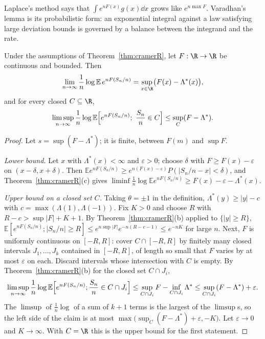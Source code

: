 Laplace's method says that $\int e^{nF(x)}g(x)\dd x$ grows like $e^{n\max F}$. Varadhan's lemma is its probabilistic form: an exponential integral against a law satisfying
large deviation bounds is governed by a balance between the integrand and the rate.

\begin{theorem}\label{thm:varadhan}
Under the assumptions of Theorem~\ref{thm:cramerR}, let $F:\R\to\R$ be continuous and bounded. Then
\[
\lim_{n\to\infty}\frac1n\log\mathbb E\,e^{nF(S_n/n)}=\sup_{x\in\R}\bigl(F(x)-\Lambda^*(x)\bigr),
\]
and for every closed $C\subseteq\R$,
\[
\limsup_{n\to\infty}\frac1n\log\mathbb E\Bigl[e^{nF(S_n/n)};\ \frac{S_n}n\in C\Bigr]\le\sup_C(F-\Lambda^*).
\]
\end{theorem}
\begin{proof}
Let $s=\sup(F-\Lambda^*)$; it is finite, between $F(m)$ and $\sup F$.

\emph{Lower bound.} Let $x$ with $\Lambda^*(x)<\infty$ and $\varepsilon>0$; choose $\delta$ with $F\ge F(x)-\varepsilon$ on $(x-\delta,x+\delta)$. Then
$\mathbb Ee^{nF(S_n/n)}\ge e^{n(F(x)-\varepsilon)}P(|S_n/n-x|<\delta)$, and Theorem~\ref{thm:cramerR}(c) gives $\liminf\frac1n\log\mathbb Ee^{nF(S_n/n)}\ge F(x)-\varepsilon-\Lambda^*(x)$.

\emph{Upper bound on a closed set $C$.} Taking $\theta=\pm1$ in the definition, $\Lambda^*(y)\ge|y|-c$ with $c=\max(\Lambda(1),\Lambda(-1))$. Fix $K>0$ and choose $R$ with $R-c>\sup|F|+K+1$.
By Theorem~\ref{thm:cramerR}(b) applied to $\{|y|\ge R\}$, $\mathbb E[e^{nF(S_n/n)};|S_n/n|\ge R]\le e^{n\sup|F|}e^{-n(R-c-1)}\le e^{-nK}$ for large $n$. Next, $F$ is uniformly
continuous on $[-R,R]$: cover $C\cap[-R,R]$ by finitely many closed intervals $J_1,\dots,J_k$ contained in $[-R,R]$, of length so small that $F$ varies by at most $\varepsilon$ on each. Discard intervals whose intersection with $C$ is empty. By Theorem~\ref{thm:cramerR}(b) for the
closed set $C\cap J_i$,
\[
\limsup_{n\to\infty}\frac1n\log\mathbb E\Bigl[e^{nF(S_n/n)};\frac{S_n}n\in C\cap J_i\Bigr]\le\sup_{C\cap J_i}F-\inf_{C\cap J_i}\Lambda^*\le\sup_{C\cap J_i}(F-\Lambda^*)+\varepsilon.
\]
The $\limsup$ of $\frac1n\log$ of a sum of $k+1$ terms is the largest of the $\limsup$s, so the left side of the claim is at most $\max\bigl(\sup_C(F-\Lambda^*)+\varepsilon,-K\bigr)$. Let
$\varepsilon\to0$ and $K\to\infty$. With $C=\R$ this is the upper bound for the first statement.
\end{proof}

